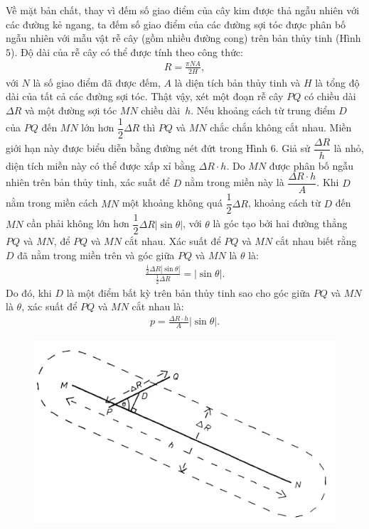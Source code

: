 \begin{multicols}{2}
\begin{figure}[H]
		\vspace*{-10pt}
	\end{figure}
	Về mặt bản chất, thay vì đếm số giao điểm của cây kim được thả ngẫu nhiên với các đường kẻ ngang, ta đếm số giao điểm của các đường sợi tóc được phân bố ngẫu nhiên với mẫu vật rễ cây (gồm nhiều đường cong) trên bản thủy tinh (Hình $5$).
	\vskip 0.1cm
	Độ dài của rễ cây có thể được tính theo công thức:
	\begin{align*}
		R= \frac{\pi N A}{2H},	\tag{$4$}
	\end{align*}
	với $N$ là số giao điểm đã được đếm, $A$ là diện tích bản thủy tinh và $H$ là tổng độ dài của tất cả các đường sợi tóc.
	\vskip 0.1cm
	Thật vậy, xét một đoạn rễ cây $PQ$ có chiều dài $\Delta R$ và một đường sợi tóc $MN$ chiều dài~$h$. Nếu khoảng cách từ trung điểm $D$ của $PQ$ đến $MN$ lớn hơn $\dfrac{1}{2}\Delta R$ thì $PQ$ và $MN$ chắc chắn không cắt nhau. Miền giới hạn này được biểu diễn bằng đường nét đứt trong Hình $6$. Giả sử $\dfrac{\Delta R}{h}$ là nhỏ, diện tích miền này có thể được xấp xỉ bằng $\Delta R \cdot h$. Do $MN$ được phân bố ngẫu nhiên trên bản thủy tinh, xác suất để $D$ nằm trong miền này là $\dfrac{\Delta R \cdot h}{A}$.
	\vskip 0.1cm
	Khi $D$ nằm trong miền cách $MN$ một khoảng không quá $\dfrac{1}{2}\Delta R$, khoảng cách từ $D$ đến $MN$ cần phải không lớn hơn $\dfrac{1}{2}\Delta R |\sin \theta |$, với $\theta$ là góc tạo bởi hai đường thẳng $PQ$ và $MN$, để $PQ$ và $MN$ cắt nhau. Xác suất để $PQ$ và $MN$ cắt nhau biết rằng $D$ đã nằm trong miền trên và góc giữa $PQ$ và $MN$ là $\theta$ là:
	\begin{align*}
		\frac{\frac{1}{2}\Delta R|\sin\theta|}{\frac{1}{2}\Delta R} = |\sin\theta|.
	\end{align*}
	Do đó, khi $D$ là một điểm bất kỳ trên bản thủy tinh sao cho góc giữa $PQ$ và $MN$ là $\theta$, xác suất để $PQ$ và $MN$ cắt nhau là:
	\begin{align*}
		p = \frac{\Delta R\cdot h}{A} |\sin\theta|.
	\end{align*}
	\begin{figure}[H]
		\vspace*{-10pt}
		\centering
		\captionsetup{labelformat= empty, justification=centering}
		\includegraphics[width=0.9\linewidth]{9}

\end{figure}
\end{multicols}
